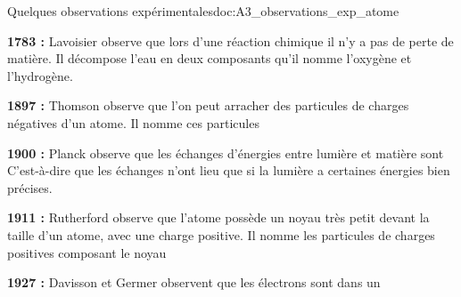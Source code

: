 \newpage
\vspace*{-36pt}
\begin{doc}{Quelques observations expérimentales}{doc:A3_observations_exp_atome}
  \begin{listePoints}
    \item \textbf{1783 :} Lavoisier observe que lors d'une réaction chimique il n'y a pas de perte de matière.
    Il décompose l'eau en deux composants qu'il nomme l'oxygène et l'hydrogène. 
    \item \textbf{1897 :} Thomson observe que l’on peut arracher des particules de charges négatives d’un atome.
    Il nomme ces particules 
    \item \textbf{1900 :} Planck observe que les échanges d'énergies entre lumière et matière sont 
    C'est-à-dire que les échanges n'ont lieu que si la lumière a certaines énergies bien précises.
    \item \textbf{1911 :} Rutherford observe que l'atome possède un noyau très petit devant la taille d’un atome, avec une charge positive.
    Il nomme les particules de charges positives composant le noyau 
    \item \textbf{1927 :} Davisson et Germer observent que les électrons sont  dans un 
  \end{listePoints}
\end{doc}

